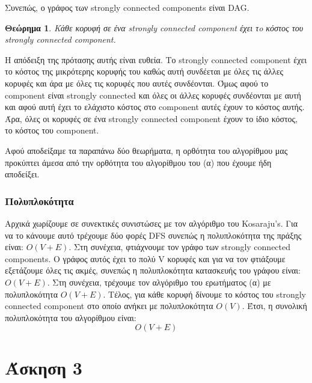 \documentclass[a4paper,oneside, 11pt]{article}
\newtheorem{theorem}{Θεώρημα}
\begin{document}
Συνεπώς, ο γράφος των strongly connected components είναι DAG.

\begin{theorem}
Κάθε κορυφή σε ένα strongly connected component έχει τo κόστος του strongly connected component.
\end{theorem}

Η απόδειξη της πρότασης αυτής είναι ευθεία. Το strongly connected component έχει το κόστος της μικρότερης κορυφής του καθώς αυτή συνδέεται με όλες τις άλλες κορυφές και άρα με όλες τις κορυφές που αυτές συνδέονται. Όμως αφού το component είναι strongly connected και όλες οι άλλες κορυφές συνδέονται με αυτή και αφού αυτή έχει το ελάχιστο κόστος στο component αυτές έχουν το κόστος αυτής. Άρα, όλες οι κορυφές σε ένα strongly connected component έχουν το ίδιο κόστος, το κόστος του component.
\bigbreak

Αφού αποδείξαμε τα παραπάνω δύο θεωρήματα, η ορθότητα του αλγορίθμου μας προκύπτει άμεσα από την ορθότητα του αλγορίθμου του (α) που έχουμε ήδη αποδείξει.
\subsubsection{Πολυπλοκότητα}

Αρχικά χωρίζουμε σε συνεκτικές συνιστώσες με τον αλγόριθμο του Kosaraju's. Για να το κάνουμε αυτό τρέχουμε δύο φορές DFS συνεπώς η πολυπλοκότητα της πράξης είναι: $O(V+E)$. Στη συνέχεια, φτιάχνουμε τον γράφο των strongly connected components. Ο γράφος αυτός έχει το πολύ V κορυφές και για να τον φτιάξουμε εξετάζουμε όλες τις ακμές, συνεπώς η πολυπλοκότητα κατασκευής του γράφου είναι: $O(V+E)$. Στη συνέχεια, τρέχουμε τον αλγόριθμο του ερωτήματος (α) με πολυπλοκότητα $O(V+E)$. Τέλος, για κάθε κορυφή δίνουμε το κόστος του strongly connected component στο οποίο ανήκει με πολυπλοκότητα $O(V)$. Έτσι, η συνολική πολυπλοκότητα του αλγορίθμου είναι:
$$O(V+E)$$




\section{Άσκηση 3}
\end{document}
